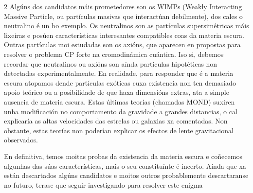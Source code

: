 \begin{multicols}{2}
Algúns dos candidatos máis prometedores son os WIMPs (Weakly Interacting
Massive Particle, ou partículas masivas que interactúan debilmente), dos cales
o neutralino é un bo exemplo. Os neutralinos son as partículas supersimétricas
máis lixeiras e posúen características interesantes compatibles coas da materia
escura. Outras partículas moi estudadas son os axións, que aparecen en
propostas para resolver o problema CP forte na cromodinámica cuántica. Iso si,
debemos recordar que neutralinos ou axións son aínda partículas hipotéticas non
detectadas experimentalmente. En realidade, para responder que é a materia
escura atopamos dende partículas exóticas cuxa existencia non ten demasiado
apoio teórico ou a posibilidade de que haxa dimensións extras, ata a simple
ausencia de materia escura. Estas últimas teorías (chamadas MOND) suxiren unha
modificación no comportamento da gravidade a grandes distancias, o cal
explicaría as altas velocidades das estrelas ou galaxias xa comentadas. Non
obstante, estas teorías non poderían explicar os efectos de lente gravitacional
observados.

En definitiva, temos moitas probas da existencia da materia escura e coñecemos
algunhas das súas características, mais o seu constituínte é incerto. Aínda que
xa están descartados algúns candidatos e moitos outros probablemente
descartaranse no futuro, terase que seguir investigando para resolver este
enigma

\nocite{alberto2021materiaescura}
\nocite{krauss5esencia}
\nocite{hubbleNASA}
\nocite{hubbleNASA2}

\printbibliography

\end{multicols}
